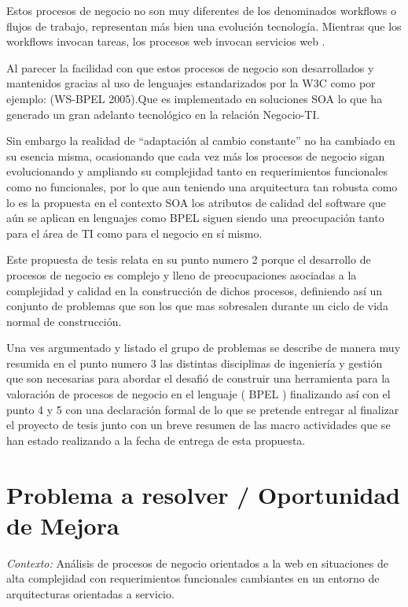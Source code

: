 \documentclass[spanish]{article}
\begin{document}
Estos procesos de negocio no son muy diferentes de los denominados
workflows o flujos de trabajo, representan más bien una evolución
tecnología. Mientras que los workflows invocan tareas, los procesos
web invocan servicios web \cite{Cardoso2008}.

Al parecer la facilidad con que estos procesos de negocio son desarrollados
y mantenidos gracias al uso de lenguajes estandarizados por la W3C
como por ejemplo: (WS-BPEL 2005).Que es implementado en soluciones
SOA lo que ha generado un gran adelanto tecnológico en la relación
Negocio-TI.

Sin embargo la realidad de ``adaptación al cambio constante” no ha
cambiado en su esencia misma, ocasionando que cada vez más los procesos
de negocio sigan evolucionando y ampliando su complejidad tanto en
requerimientos funcionales como no funcionales, por lo que aun teniendo
una arquitectura tan robusta como lo es la propuesta en el contexto
SOA los atributos de calidad del software que aún se aplican en lenguajes
como BPEL siguen siendo una preocupación tanto para el área de TI
como para el negocio en sí mismo.

Este propuesta de tesis relata en su punto numero 2 porque el desarrollo
de procesos de negocio es complejo y lleno de preocupaciones asociadas
a la complejidad y calidad en la construcción de dichos procesos,
definiendo así un conjunto de problemas que son los que mas sobresalen
durante un ciclo de vida normal de construcción.

Una ves argumentado y listado el grupo de problemas se describe de
manera muy resumida en el punto numero 3 las distintas disciplinas
de ingeniería y gestión que son necesarias para abordar el desafió
de construir una herramienta para la valoración de procesos de negocio
en el lenguaje ( BPEL ) finalizando así con el punto 4 y 5 con una
declaración formal de lo que se pretende entregar al finalizar el
proyecto de tesis junto con un breve resumen de las macro actividades
que se han estado realizando a la fecha de entrega de esta propuesta. 


\section{Problema a resolver / Oportunidad de Mejora}

\emph{Contexto:} Análisis de procesos de negocio orientados a la web
en situaciones de alta complejidad con requerimientos funcionales
cambiantes en un entorno de arquitecturas orientadas a servicio.
\end{document}
